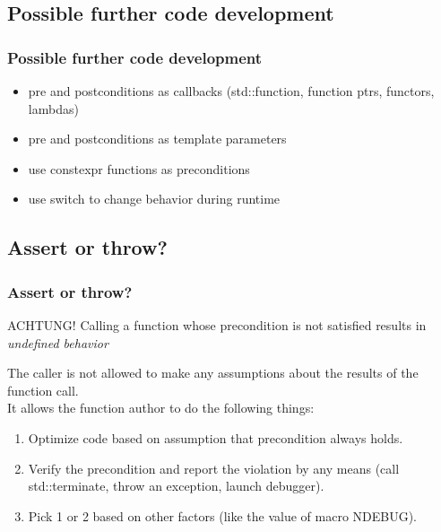 \documentclass{beamer}
\begin{document}
\subsection{Possible further code development}
\begin{frame}
\frametitle{Possible further code development}
\begin{itemize}
  \item pre and postconditions as callbacks (std::function, function ptrs, functors, lambdas)
  \item pre and postconditions as template parameters
  \item use constexpr functions as preconditions
  \item use switch to change behavior during runtime
\end{itemize}
\end{frame}

\subsection{Assert or throw?}
\begin{frame}[fragile]
\frametitle{Assert or throw?}
\begin{alertblock}{ACHTUNG!}
Calling a function whose precondition is not satisfied results in \textit{undefined behavior}
\end{alertblock}
\pause
The caller is not allowed to make any assumptions about the results of the function call. \\
It allows the function author to do the following things:
\begin{enumerate}[<+->]
  \item Optimize code based on assumption that precondition always holds.
  \item Verify the precondition and report the violation by any means (call std::terminate, throw an exception, launch debugger).
  \item Pick 1 or 2 based on other factors (like the value of macro NDEBUG).
\end{enumerate}
\end{frame}
\end{document}
